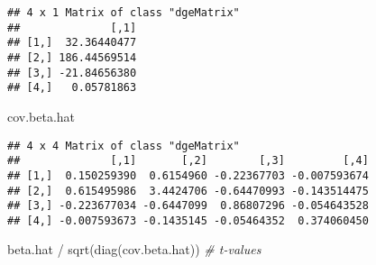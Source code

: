 \documentclass[
]{book}
\newenvironment{Shaded}{\begin{snugshade}}{\end{snugshade}}
\newcommand{\AttributeTok}[1]{\textcolor[rgb]{0.77,0.63,0.00}{#1}}
\newcommand{\CommentTok}[1]{\textcolor[rgb]{0.56,0.35,0.01}{\textit{#1}}}
\newcommand{\FunctionTok}[1]{\textcolor[rgb]{0.00,0.00,0.00}{#1}}
\newcommand{\NormalTok}[1]{#1}
\newcommand{\OtherTok}[1]{\textcolor[rgb]{0.56,0.35,0.01}{#1}}
\newcommand{\SpecialCharTok}[1]{\textcolor[rgb]{0.00,0.00,0.00}{#1}}
\newcommand{\StringTok}[1]{\textcolor[rgb]{0.31,0.60,0.02}{#1}}
\begin{document}
\begin{Shaded}
\end{Shaded}

\begin{verbatim}
## 4 x 1 Matrix of class "dgeMatrix"
##              [,1]
## [1,]  32.36440477
## [2,] 186.44569514
## [3,] -21.84656380
## [4,]   0.05781863
\end{verbatim}

\begin{Shaded}
\begin{Highlighting}[]
\NormalTok{cov.beta.hat}
\end{Highlighting}
\end{Shaded}

\begin{verbatim}
## 4 x 4 Matrix of class "dgeMatrix"
##              [,1]       [,2]        [,3]         [,4]
## [1,]  0.150259390  0.6154960 -0.22367703 -0.007593674
## [2,]  0.615495986  3.4424706 -0.64470993 -0.143514475
## [3,] -0.223677034 -0.6447099  0.86807296 -0.054643528
## [4,] -0.007593673 -0.1435145 -0.05464352  0.374060450
\end{verbatim}

\begin{Shaded}
\begin{Highlighting}[]
\NormalTok{beta.hat }\SpecialCharTok{/} \FunctionTok{sqrt}\NormalTok{(}\FunctionTok{diag}\NormalTok{(cov.beta.hat)) }\CommentTok{\# t{-}values}
\end{Highlighting}
\end{Shaded}
\end{document}
